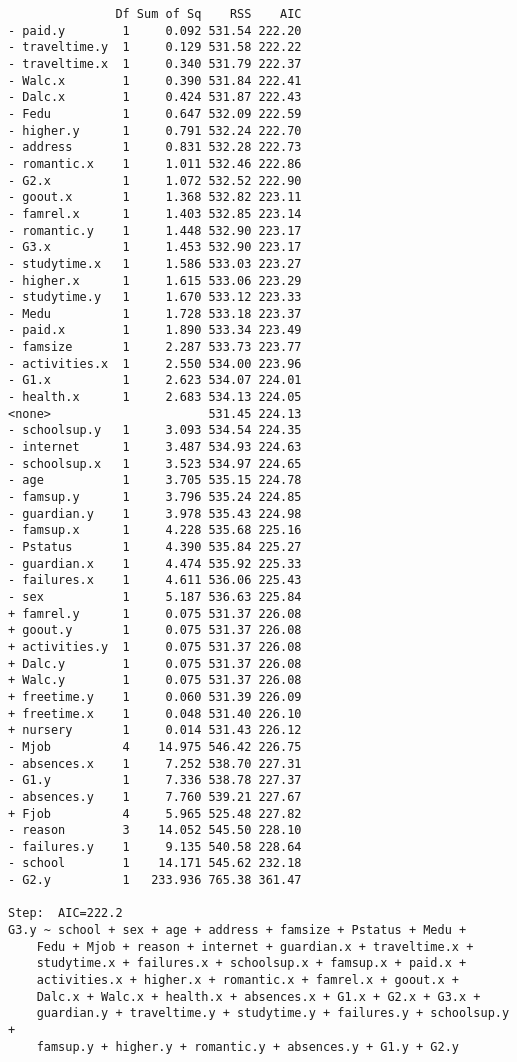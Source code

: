 \documentclass[11pt]{article}
\begin{document}
\begin{enumerate}
\begin{verbatim}
               Df Sum of Sq    RSS    AIC
- paid.y        1     0.092 531.54 222.20
- traveltime.y  1     0.129 531.58 222.22
- traveltime.x  1     0.340 531.79 222.37
- Walc.x        1     0.390 531.84 222.41
- Dalc.x        1     0.424 531.87 222.43
- Fedu          1     0.647 532.09 222.59
- higher.y      1     0.791 532.24 222.70
- address       1     0.831 532.28 222.73
- romantic.x    1     1.011 532.46 222.86
- G2.x          1     1.072 532.52 222.90
- goout.x       1     1.368 532.82 223.11
- famrel.x      1     1.403 532.85 223.14
- romantic.y    1     1.448 532.90 223.17
- G3.x          1     1.453 532.90 223.17
- studytime.x   1     1.586 533.03 223.27
- higher.x      1     1.615 533.06 223.29
- studytime.y   1     1.670 533.12 223.33
- Medu          1     1.728 533.18 223.37
- paid.x        1     1.890 533.34 223.49
- famsize       1     2.287 533.73 223.77
- activities.x  1     2.550 534.00 223.96
- G1.x          1     2.623 534.07 224.01
- health.x      1     2.683 534.13 224.05
<none>                      531.45 224.13
- schoolsup.y   1     3.093 534.54 224.35
- internet      1     3.487 534.93 224.63
- schoolsup.x   1     3.523 534.97 224.65
- age           1     3.705 535.15 224.78
- famsup.y      1     3.796 535.24 224.85
- guardian.y    1     3.978 535.43 224.98
- famsup.x      1     4.228 535.68 225.16
- Pstatus       1     4.390 535.84 225.27
- guardian.x    1     4.474 535.92 225.33
- failures.x    1     4.611 536.06 225.43
- sex           1     5.187 536.63 225.84
+ famrel.y      1     0.075 531.37 226.08
+ goout.y       1     0.075 531.37 226.08
+ activities.y  1     0.075 531.37 226.08
+ Dalc.y        1     0.075 531.37 226.08
+ Walc.y        1     0.075 531.37 226.08
+ freetime.y    1     0.060 531.39 226.09
+ freetime.x    1     0.048 531.40 226.10
+ nursery       1     0.014 531.43 226.12
- Mjob          4    14.975 546.42 226.75
- absences.x    1     7.252 538.70 227.31
- G1.y          1     7.336 538.78 227.37
- absences.y    1     7.760 539.21 227.67
+ Fjob          4     5.965 525.48 227.82
- reason        3    14.052 545.50 228.10
- failures.y    1     9.135 540.58 228.64
- school        1    14.171 545.62 232.18
- G2.y          1   233.936 765.38 361.47

Step:  AIC=222.2
G3.y ~ school + sex + age + address + famsize + Pstatus + Medu + 
    Fedu + Mjob + reason + internet + guardian.x + traveltime.x + 
    studytime.x + failures.x + schoolsup.x + famsup.x + paid.x + 
    activities.x + higher.x + romantic.x + famrel.x + goout.x + 
    Dalc.x + Walc.x + health.x + absences.x + G1.x + G2.x + G3.x + 
    guardian.y + traveltime.y + studytime.y + failures.y + schoolsup.y + 
    famsup.y + higher.y + romantic.y + absences.y + G1.y + G2.y


\end{verbatim}
\end{enumerate}
\end{document}
